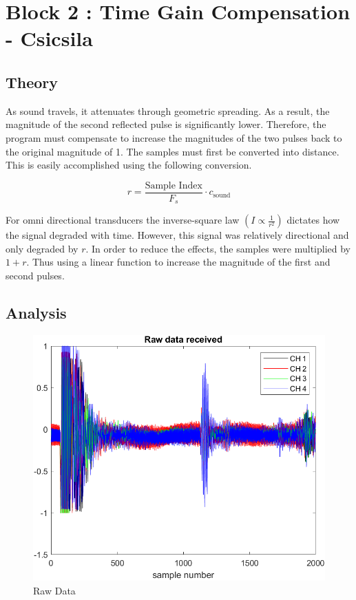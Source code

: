 \section{Block 2 : Time Gain Compensation - Csicsila}

    \subsection{Theory}
    As sound travels, it attenuates through geometric spreading.  As a result, the magnitude of the second reflected pulse is significantly lower. Therefore, the program must compensate to increase the magnitudes of the two pulses back to the original magnitude of 1. 
    The samples must first be converted into distance. This is easily accomplished using the following conversion.
    
    \begin{equation}
        r = \frac{\text{Sample Index}}{F_s} \cdot c_{\text{sound}}
        \label{eq:distanceTGC}
    \end{equation}
    
    

    For omni directional transducers the inverse-square law $(I \propto  \frac{1} {r^2} )$ dictates how the signal degraded with time. However, this signal was relatively directional and only degraded by $r$. In order to reduce the effects, the samples were multiplied by $1 + r$. Thus using a linear function to increase the magnitude of the first and second pulses.  


    \subsection{Analysis}

    \begin{figure}[H]
        \centering
        \includegraphics[width=0.5\linewidth]{figures/rawData.png}
        \caption{Raw Data}
        \label{fig:raw_data}
    \end{figure}

